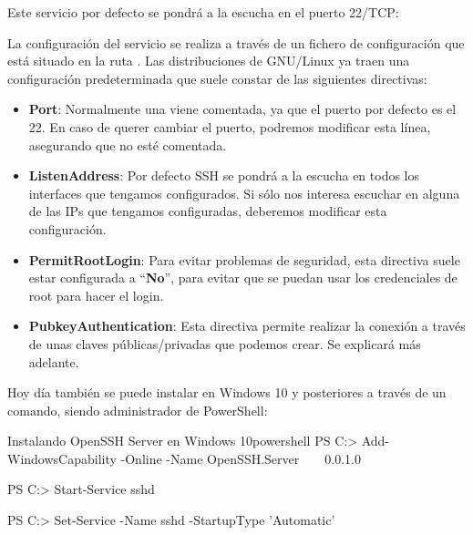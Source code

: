 Este servicio por defecto se pondrá a la escucha en el puerto 22/TCP:


La configuración del servicio se realiza a través de un fichero de configuración que está situado en la ruta . Las distribuciones de GNU/Linux ya traen una configuración predeterminada que suele constar de las siguientes directivas:

\begin{itemize}
    \item \textbf{Port}: Normalmente una viene comentada, ya que el puerto por defecto es el 22. En caso de querer cambiar el puerto, podremos modificar esta línea, asegurando que no esté comentada.

    \item \textbf{ListenAddress}: Por defecto SSH se pondrá a la escucha en todos los interfaces que tengamos configurados. Si sólo nos interesa escuchar en alguna de las IPs que tengamos configuradas, deberemos modificar esta configuración.

    \item \textbf{PermitRootLogin}: Para evitar problemas de seguridad, esta directiva suele estar configurada a “\textbf{No}”, para evitar que se puedan usar los credenciales de root para hacer el login.

    \item \textbf{PubkeyAuthentication}: Esta directiva permite realizar la conexión a través de unas claves públicas/privadas que podemos crear. Se explicará más adelante.
\end{itemize}

Hoy día también se puede instalar en Windows 10 y posteriores a través de un comando, siendo administrador de PowerShell:

\begin{mycode}{Instalando OpenSSH Server en Windows 10}{powershell}{{\footnotesize }}
PS C:\Windows{}> Add-WindowsCapability -Online -Name OpenSSH.Server~~~~0.0.1.0

PS C:\Windows{}> Start-Service sshd

PS C:\Windows{}> Set-Service -Name sshd -StartupType 'Automatic'
\end{mycode}


